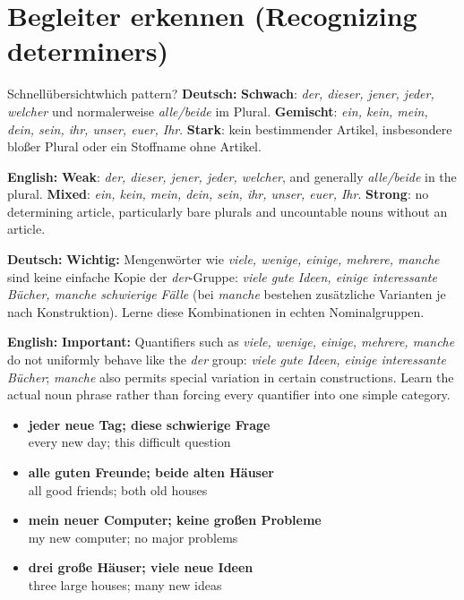 \documentclass[a4paper,11pt]{article}
\newcommand{\GermanText}[1]{\textbf{Deutsch: }#1\par}
\newcommand{\EnglishText}[1]{{\small\color{SoftGray}\textbf{English: }#1\par}}
\newcommand{\ExampleItem}[2]{\item \textbf{#1}\\{\small\color{SoftGray}#2}}
\begin{document}
\section{Begleiter erkennen \textnormal{(Recognizing determiners)}}
\begin{grammarentry}{Schnellübersicht}{which pattern?}
\GermanText{\textbf{Schwach}: \emph{der, dieser, jener, jeder, welcher} und normalerweise \emph{alle/beide} im Plural. \textbf{Gemischt}: \emph{ein, kein, mein, dein, sein, ihr, unser, euer, Ihr}. \textbf{Stark}: kein bestimmender Artikel, insbesondere bloßer Plural oder ein Stoffname ohne Artikel.}
\EnglishText{\textbf{Weak}: \emph{der, dieser, jener, jeder, welcher}, and generally \emph{alle/beide} in the plural. \textbf{Mixed}: \emph{ein, kein, mein, dein, sein, ihr, unser, euer, Ihr}. \textbf{Strong}: no determining article, particularly bare plurals and uncountable nouns without an article.}
\GermanText{\textbf{Wichtig:} Mengenwörter wie \emph{viele, wenige, einige, mehrere, manche} sind keine einfache Kopie der \emph{der}-Gruppe: \emph{viele gute Ideen, einige interessante Bücher, manche schwierige Fälle} (bei \emph{manche} bestehen zusätzliche Varianten je nach Konstruktion). Lerne diese Kombinationen in echten Nominalgruppen.}
\EnglishText{\textbf{Important:} Quantifiers such as \emph{viele, wenige, einige, mehrere, manche} do not uniformly behave like the \emph{der} group: \emph{viele gute Ideen, einige interessante Bücher}; \emph{manche} also permits special variation in certain constructions. Learn the actual noun phrase rather than forcing every quantifier into one simple category.}
\end{grammarentry}
\begin{exbox}\begin{itemize}
\ExampleItem{jeder neue Tag; diese schwierige Frage}{every new day; this difficult question}
\ExampleItem{alle guten Freunde; beide alten Häuser}{all good friends; both old houses}
\ExampleItem{mein neuer Computer; keine großen Probleme}{my new computer; no major problems}
\ExampleItem{drei große Häuser; viele neue Ideen}{three large houses; many new ideas}
\end{itemize}\end{exbox}
\end{document}
